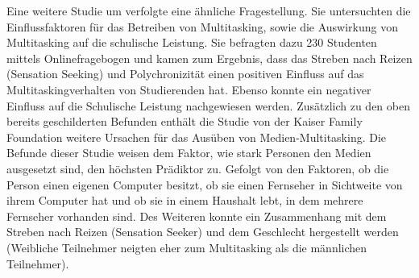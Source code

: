 Eine weitere Studie um  verfolgte eine ähnliche Fragestellung. Sie untersuchten die Einflussfaktoren für das Betreiben von Multitasking, sowie die Auswirkung von Multitasking auf die schulische Leistung. Sie befragten dazu 230 Studenten mittels Onlinefragebogen und kamen zum Ergebnis, dass das Streben nach Reizen (Sensation Seeking) und Polychronizität einen positiven Einfluss auf das Multitaskingverhalten von Studierenden hat. Ebenso konnte ein negativer Einfluss auf die Schulische Leistung nachgewiesen werden. Zusätzlich zu den oben bereits geschilderten Befunden enthält die Studie von  der Kaiser Family Foundation weitere Ursachen für das Ausüben von Medien-Multitasking. Die Befunde dieser Studie weisen dem Faktor, wie stark Personen den Medien ausgesetzt sind, den höchsten Prädiktor zu. Gefolgt von den Faktoren, ob die Person einen eigenen Computer besitzt, ob sie einen Fernseher in Sichtweite von ihrem Computer hat und ob sie in einem Haushalt lebt, in dem mehrere Fernseher vorhanden sind. Des Weiteren konnte ein Zusammenhang mit dem Streben nach Reizen (Sensation Seeker) und dem Geschlecht hergestellt werden (Weibliche Teilnehmer neigten eher zum Multitasking als die männlichen Teilnehmer).

